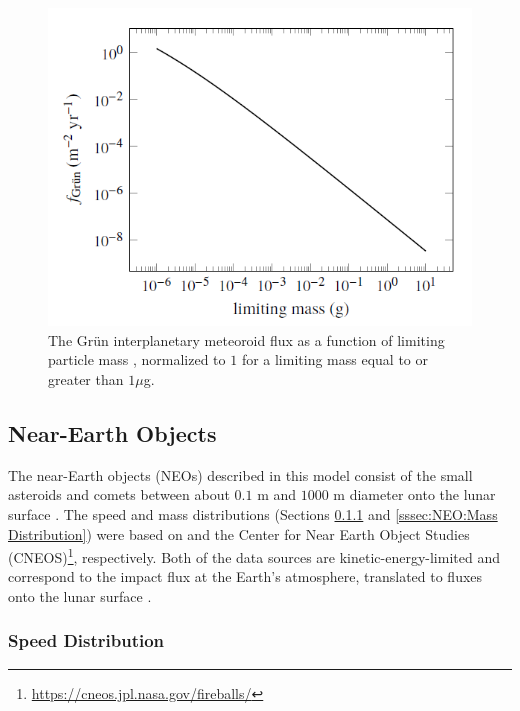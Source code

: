 \documentclass{article}
\begin{document}
\begin{figure}[!htb]
	\centering
	\includegraphics[scale=0.65]{MEM_UG_Fig2.1_partile-mass-distribution.PNG}
	\caption{The Gr{\"u}n interplanetary meteoroid flux as a function of limiting particle mass \citep[Figure 1]{moorhead2019nasa}, normalized to $1$ for a limiting mass equal to or greater than $1\mu$g.}\label{fig:MEM_UG_Fig2.1_partile-mass-distribution}
\end{figure}

	
\subsection{Near-Earth Objects}\label{ssec:Near-Earth Objects}

The near-Earth objects (NEOs) described in this model consist of the small asteroids and comets between about $0.1$ m and $1000$ m diameter onto the lunar surface \citep{moorhead2020memo}. The speed and mass distributions (Sections \ref{sssec:NEO:Speed Distribution} and \ref{sssec:NEO:Mass Distribution}) were based on \cite{brown2002flux} and the Center for Near Earth Object Studies (CNEOS)\footnote{\url{https://cneos.jpl.nasa.gov/fireballs/}}, respectively. Both of the data sources are kinetic-energy-limited and correspond to the impact flux at the Earth's atmosphere, translated to fluxes onto the lunar surface \citep{moorhead2020memo}.

\subsubsection{Speed Distribution}\label{sssec:NEO:Speed Distribution}
\end{document}
